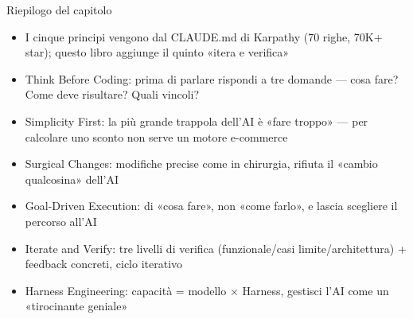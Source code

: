 \begin{tcbsummary}{Riepilogo del capitolo}
\begin{itemize}
  \item I cinque principi vengono dal CLAUDE.md di Karpathy (70 righe, 70K+ star); questo libro aggiunge il quinto «itera e verifica»
  \item Think Before Coding: prima di parlare rispondi a tre domande — cosa fare? Come deve risultare? Quali vincoli?
  \item Simplicity First: la più grande trappola dell'AI è «fare troppo» — per calcolare uno sconto non serve un motore e-commerce
  \item Surgical Changes: modifiche precise come in chirurgia, rifiuta il «cambio qualcosina» dell'AI
  \item Goal-Driven Execution: di «cosa fare», non «come farlo», e lascia scegliere il percorso all'AI
  \item Iterate and Verify: tre livelli di verifica (funzionale/casi limite/architettura) + feedback concreti, ciclo iterativo
  \item Harness Engineering: capacità = modello × Harness, gestisci l'AI come un «tirocinante geniale»
\end{itemize}

\end{tcbsummary}
